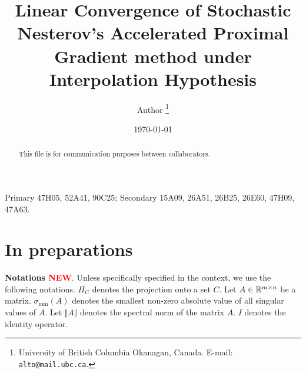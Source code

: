 \documentclass[12pt]{article}
\begin{document}
\title{{\selectfont Linear Convergence of Stochastic Nesterov's Accelerated Proximal Gradient method under Interpolation Hypothesis}}

\author{
    Author
    \thanks{
        University of British Columbia Okanagan,
        Canada. E-mail: \texttt{alto@mail.ubc.ca}.
    }
}

\date{\today}

\maketitle
{}

\begin{abstract} 
    This file is for communication purposes between collaborators. 

\end{abstract}

Primary 47H05, 52A41, 90C25; Secondary 15A09, 26A51, 26B25, 26E60, 47H09, 47A63.


\section{In preparations}
    \textbf{Notations \textcolor{red}{NEW}}. 
    Unless specifically specified in the context, we use the following notations. 
    $\Pi_C$ denotes the projection onto a set $C$. 
    Let $A \in \mathbb R^{m \times n}$ be a matrix. 
    $\sigma_{\min}(A)$ denotes the smallest non-zero absolute value of all singular values of $A$. 
    Let $\Vert A\Vert$ denotes the spectral norm of the matrix $A$. 
    $I$ denotes the identity operator. 
\end{document}
